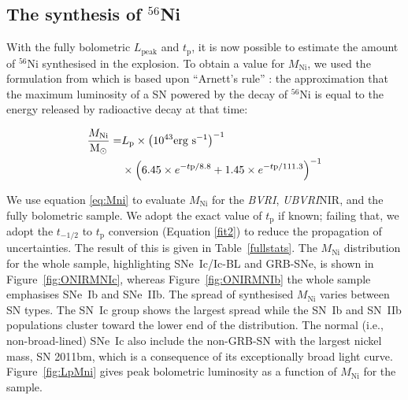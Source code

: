 \documentclass[a4paper,fleqn,usenatbib]{mnras}
\begin{document}
\subsection{The synthesis of $^{56}$Ni}
With the fully bolometric $L_{\mathrm{peak}}$ and $t_{\mathrm{p}}$, it is now possible to estimate the amount of $^{56}$Ni synthesised in the explosion. To obtain a value for $M_{\mathrm{Ni}}$, we used the formulation from \cite{SL2005} which is based upon ``Arnett's rule'' \citep{Arnett1982}: the approximation that the maximum luminosity of a SN powered by the decay of $^{56}$Ni is equal to the energy released by radioactive decay at that time:

\begin{equation}
\begin{split}
\frac{M_{\mathrm{Ni}}}{{\rm M}_\odot}= & L_{\mathrm{p}}\times\left(10^{43} \textrm{erg s}^{-1} \right)^{-1} \\ & \times \left(6.45\times e^{-t{\mathrm{p}}/8.8}+1.45\times e^{-t{\mathrm{p}}/111.3}\right)^{-1} 
\end{split}
\label{eq:Mni}
\end{equation}

We use equation \ref{eq:Mni} to evaluate $M_{\mathrm{Ni}}$ for the \textit{BVRI}, \textit{UBVRI}NIR, and the fully bolometric sample. We adopt the exact value of $t_{\mathrm{p}}$ if known; failing that, we adopt the $t_{-1/2}$ to  $t_{\mathrm{p}}$ conversion (Equation \ref{fit2}) to reduce the propagation of uncertainties. The result of this is given in Table~\ref{fullstats}. The $M_{\mathrm{Ni}}$ distribution for the whole sample, highlighting SNe~Ic/Ic-BL and GRB-SNe, is shown in Figure~\ref{fig:ONIRMNIc}, whereas Figure~\ref{fig:ONIRMNIb} the whole sample emphasises SNe~Ib and SNe~IIb. The spread of synthesised $M_{\mathrm{Ni}}$ varies between SN types. The SN~Ic group shows the largest spread while the SN~Ib and SN~IIb populations cluster toward the lower end of the distribution. The normal (i.e., non-broad-lined) SNe~Ic also include the non-GRB-SN with the largest nickel mass, SN 2011bm, which is a consequence of its exceptionally broad light curve. Figure~\ref{fig:LpMni} gives peak bolometric luminosity as a function of $M_{\mathrm{Ni}}$ for the sample.
\end{document}
